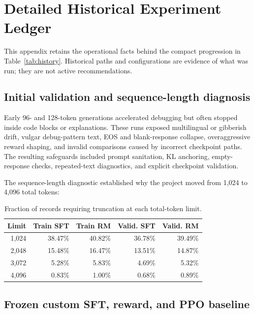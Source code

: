 \documentclass[11pt]{article}
\begin{document}
\appendix

\section{Detailed Historical Experiment Ledger}

This appendix retains the operational facts behind the compact progression in
Table~\ref{tab:history}. Historical paths and configurations are evidence of
what was run; they are not active recommendations.

\subsection{Initial validation and sequence-length diagnosis}

Early 96- and 128-token generations accelerated debugging but often stopped
inside code blocks or explanations. These runs exposed multilingual or
gibberish drift, vulgar debug-pattern text, EOS and blank-response collapse,
overaggressive reward shaping, and invalid comparisons caused by incorrect
checkpoint paths. The resulting safeguards included prompt sanitation, KL
anchoring, empty-response checks, repeated-text diagnostics, and explicit
checkpoint validation.

The sequence-length diagnostic established why the project moved from 1,024
to 4,096 total tokens:

\begin{table}[H]
\centering
\caption{Fraction of records requiring truncation at each total-token limit.}
\label{tab:length-ledger}
\begin{tabular}{@{}rrrrr@{}}
\toprule
\textbf{Limit} & \textbf{Train SFT} & \textbf{Train RM} &
\textbf{Valid. SFT} & \textbf{Valid. RM}\\
\midrule
1,024 & 38.47\% & 40.82\% & 36.78\% & 39.49\%\\
2,048 & 15.48\% & 16.47\% & 13.51\% & 14.87\%\\
3,072 & 5.28\% & 5.83\% & 4.69\% & 5.32\%\\
4,096 & 0.83\% & 1.00\% & 0.68\% & 0.89\%\\
\bottomrule
\end{tabular}
\end{table}

\subsection{Frozen custom SFT, reward, and PPO baseline}
\end{document}

